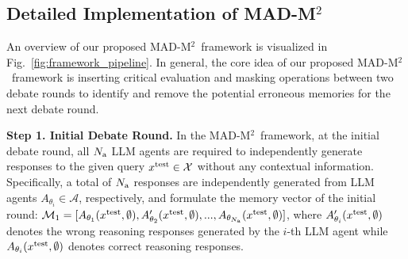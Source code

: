 \documentclass{article} %
\newcommand{\methodname}{MAD-M$^2$}
\newcommand{\uprmvar}[2]{#1^{\rm #2}}
\theoremstyle{plain}
\begin{document}
\vspace{-6pt}
\subsection{Detailed Implementation of \methodname}
\label{subsec:detailed_implementations}
\vspace{-4pt}
An overview of our proposed \methodname\ framework is visualized in Fig.~\ref{fig:framework_pipeline}. In general, the core idea of our proposed \methodname\ framework is inserting critical evaluation and masking operations between two debate rounds to identify and remove the potential erroneous memories for the next debate round. %

\textbf{Step 1. Initial Debate Round.} In the \methodname\ framework, at the initial debate round, all $N_{\rm a}$ LLM agents are required to independently generate responses to the given query $\uprmvar{x}{test}\in \mathcal{X}$ without any contextual information. Specifically, a total of $N_{\rm a}$ responses are independently generated from LLM agents $A_{\theta_i}\in\mathcal{A}$, respectively, and formulate the memory vector of the initial round: $\mathcal{M}_1=[A_{\theta_1}(\uprmvar{x}{test}, \emptyset), A^{\prime}_{\theta_2}(\uprmvar{x}{test}, \emptyset), ..., A_{\theta_{N_{\rm a}}}(\uprmvar{x}{test}, \emptyset)]$, where $A^{\prime}_{\theta_i}(\uprmvar{x}{test}, \emptyset)$ denotes the wrong reasoning responses generated by the $i$-th LLM agent while $A_{\theta_i}(\uprmvar{x}{test}, \emptyset)$ denotes correct reasoning responses.
\end{document}
